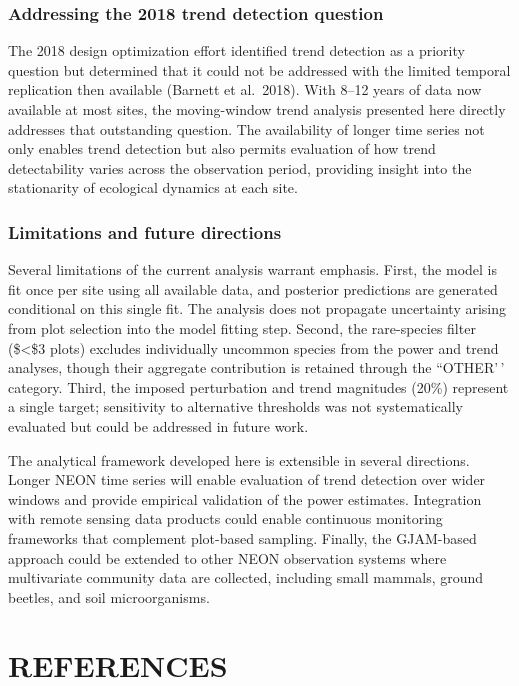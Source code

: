 \documentclass[
  11pt,
]{article}
\begin{document}
\subsubsection{Addressing the 2018 trend detection
question}\label{addressing-the-2018-trend-detection-question}

The 2018 design optimization effort identified trend detection as a
priority question but determined that it could not be addressed with the
limited temporal replication then available (Barnett et al.~2018). With
8--12 years of data now available at most sites, the moving-window trend
analysis presented here directly addresses that outstanding question.
The availability of longer time series not only enables trend detection
but also permits evaluation of how trend detectability varies across the
observation period, providing insight into the stationarity of
ecological dynamics at each site.

\subsubsection{Limitations and future
directions}\label{limitations-and-future-directions}

Several limitations of the current analysis warrant emphasis. First, the
model is fit once per site using all available data, and posterior
predictions are generated conditional on this single fit. The analysis
does not propagate uncertainty arising from plot selection into the
model fitting step. Second, the rare-species filter (\$\textless\$3
plots) excludes individually uncommon species from the power and trend
analyses, though their aggregate contribution is retained through the
``OTHER'\,' category. Third, the imposed perturbation and trend
magnitudes (20\%) represent a single target; sensitivity to alternative
thresholds was not systematically evaluated but could be addressed in
future work.

The analytical framework developed here is extensible in several
directions. Longer NEON time series will enable evaluation of trend
detection over wider windows and provide empirical validation of the
power estimates. Integration with remote sensing data products could
enable continuous monitoring frameworks that complement plot-based
sampling. Finally, the GJAM-based approach could be extended to other
NEON observation systems where multivariate community data are
collected, including small mammals, ground beetles, and soil
microorganisms.

\section{\uppercase{References}}
\end{document}
